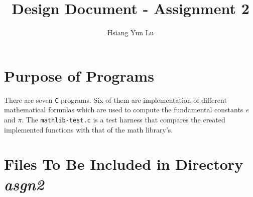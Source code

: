 \documentclass[12pt]{article}
\title{Design Document - Assignment 2}
\author{Hsiang Yun Lu}
\begin{document}
\maketitle

\section{Purpose of Programs}

There are seven \texttt{C} programs. Six of them are implementation of different mathematical formulas which are used to compute the fundamental constants \textit{e} and $\pi$. The \texttt{mathlib-test.c} is a test harness that compares the created implemented functions with that of the math library’s.

\section{Files To Be Included in Directory \textit{asgn2}}
\end{document}
